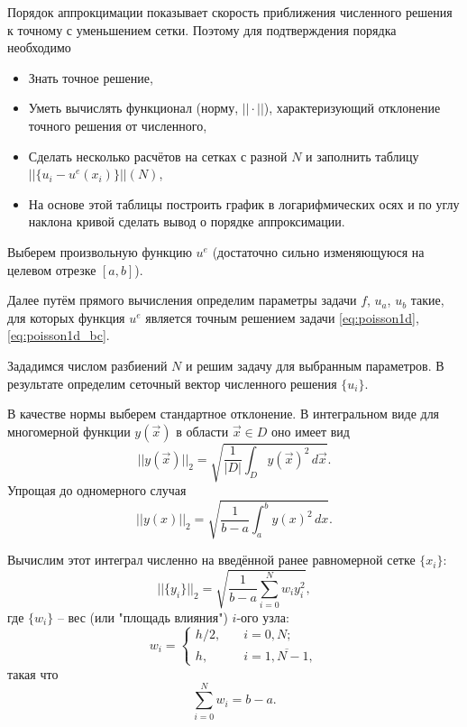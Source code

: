 
Порядок аппрокцимации показывает скорость
приближения численного решения к точному с уменьшением сетки.
Поэтому для подтверждения порядка необходимо
\begin{itemize}
\item Знать точное решение,
\item Уметь вычислять функционал (норму, $||\cdot||$), характеризующий отклонение точного решения от численного,
\item Сделать несколько расчётов на сетках с разной $N$  и заполнить таблицу $||\{u_i - u^e(x_i)\}||(N)$,
\item На основе этой таблицы построить график в логарифмических осях и по углу наклона кривой сделать вывод о порядке аппроксимации.
\end{itemize}

Выберем произвольную функцию $u^e$ (достаточно сильно изменяющуюся на целевом отрезке $[a,b]$).

Далее путём прямого вычисления определим параметры задачи $f$, $u_a$, $u_b$ такие,
для которых функция $u^e$ является точным решением задачи \eqref{eq:poisson1d}, \eqref{eq:poisson1d_bc}.

Зададимся числом разбиений $N$ и решим задачу для выбранным параметров.
В результате определим сеточный вектор численного решения $\{u_i\}$.

В качестве нормы выберем стандартное отклонение. В интегральном виде для многомерной функции $y(\vec x)$
в области $\vec x\in D$ оно имеет вид
\begin{equation*}
    ||y(\vec x)||_2 = \sqrt{\frac{1}{|D|}\int_{D} y(\vec x)^2 \, d\vec x}.
\end{equation*}
Упрощая до одномерного случая
\begin{equation*}
    ||y(x)||_2 = \sqrt{\frac{1}{b-a}\int_{a}^{b} y(x)^2 \, dx}.
\end{equation*}

Вычислим этот интеграл численно на введённой ранее равномерной сетке $\{x_i\}$:
\begin{equation*}
    ||\{y_i\}||_2 = \sqrt{\frac{1}{b-a}\sum_{i=0}^{N} w_i y_i^2},
\end{equation*}
где $\{w_i\}$ -- вес (или "площадь влияния") $i$-ого узла:
\begin{equation*}
    w_i = \begin{cases}
        h/2, &\quad i=0, N;\\
        h, &\quad i=\overline{1,N-1},
    \end{cases}
\end{equation*}
такая что
\begin{equation*}
    \sum_{i=0}^{N} w_i = b-a.
\end{equation*}

